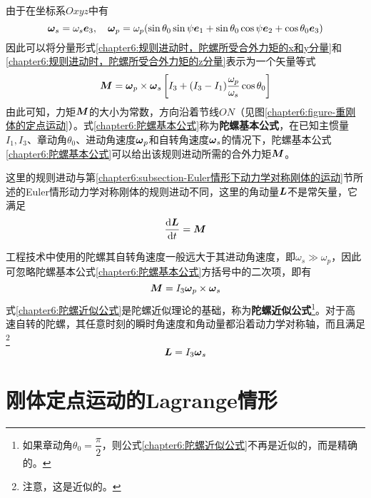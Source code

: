 由于在坐标系$Oxyz$中有
\begin{equation}
	\boldsymbol{\omega}_s = \omega_s\boldsymbol{e}_3,\quad \boldsymbol{\omega}_p = \omega_p(\sin\theta_0\sin\psi\boldsymbol{e}_1+\sin\theta_0\cos\psi\boldsymbol{e}_2+\cos\theta_0\boldsymbol{e}_3)
\end{equation}
因此可以将分量形式\eqref{chapter6:规则进动时，陀螺所受合外力矩的x和y分量}和\eqref{chapter6:规则进动时，陀螺所受合外力矩的z分量}表示为一个矢量等式
\begin{equation}
	\boldsymbol{M} = \boldsymbol{\omega}_p\times\boldsymbol{\omega}_s\left[I_3+(I_3-I_1)\dfrac{\omega_p}{\omega_s}\cos\theta_0\right]
	\label{chapter6:陀螺基本公式}
\end{equation}
由此可知，力矩$\boldsymbol{M}$的大小为常数，方向沿着节线$ON$（见图\ref{chapter6:figure-重刚体的定点运动}）。式\eqref{chapter6:陀螺基本公式}称为{\bf 陀螺基本公式}，在已知主惯量$I_1,I_3$、章动角$\theta_0$、进动角速度$\boldsymbol{\omega}_p$和自转角速度$\boldsymbol{\omega}_s$的情况下，陀螺基本公式\eqref{chapter6:陀螺基本公式}可以给出该规则进动所需的合外力矩$\boldsymbol{M}$。

这里的规则进动与第\ref{chapter6:subsection-Euler情形下动力学对称刚体的运动}节所述的Euler情形动力学对称刚体的规则进动不同，这里的角动量$\boldsymbol{L}$不是常矢量，它满足
\begin{equation*}
	\frac{\mathrm{d} \boldsymbol{L}}{\mathrm{d} t} = \boldsymbol{M}
\end{equation*}


工程技术中使用的陀螺其自转角速度一般远大于其进动角速度，即$\omega_s\gg\omega_p$，因此可忽略陀螺基本公式\eqref{chapter6:陀螺基本公式}方括号中的二次项，即有
\begin{equation}
	\boldsymbol{M} = I_3\boldsymbol{\omega}_p\times \boldsymbol{\omega}_s
	\label{chapter6:陀螺近似公式}
\end{equation}
式\eqref{chapter6:陀螺近似公式}是陀螺近似理论的基础，称为{\bf 陀螺近似公式}\footnote{如果章动角$\theta_0=\dfrac\pi2$，则公式\eqref{chapter6:陀螺近似公式}不再是近似的，而是精确的。}。对于高速自转的陀螺，其任意时刻的瞬时角速度和角动量都沿着动力学对称轴，而且满足\footnote{注意，这是近似的。}
\begin{equation*}
	\boldsymbol{L}=I_3\boldsymbol{\omega}_s
\end{equation*}

\section{刚体定点运动的Lagrange情形}

